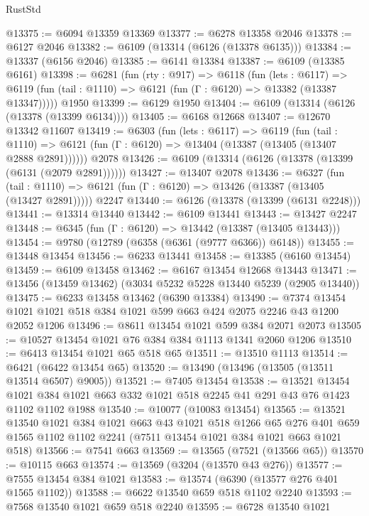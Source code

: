\begin{lexlean}{RustStd}
\begin{coremodule}
@13375 := @6094 @13359 @13369
@13377 := @6278 @13358 @2046
@13378 := @6127 @2046
@13382 := @6109 (@13314 (@6126 (@13378 @6135)))
@13384 := @13337 (@6156 @2046)
@13385 := @6141 @13384
@13387 := @6109 (@13385 @6161)
@13398 := @6281
    (fun (rty : @917) =>
    @6118
      (fun (lets : @6117) =>
      @6119 (fun (tail : @1110) => @6121 (fun (Γ : @6120) => @13382 (@13387 @13347)))))
    @1950
@13399 := @6129 @1950
@13404 := @6109 (@13314 (@6126 (@13378 (@13399 @6134))))
@13405 := @6168 @12668
@13407 := @12670 @13342 @11607
@13419 := @6303
    (fun (lets : @6117) =>
    @6119
      (fun (tail : @1110) =>
      @6121 (fun (Γ : @6120) => @13404 (@13387 (@13405 (@13407 @2888 @2891))))))
    @2078
@13426 := @6109 (@13314 (@6126 (@13378 (@13399 (@6131 (@2079 @2891))))))
@13427 := @13407 @2078
@13436 := @6327
    (fun (tail : @1110) => @6121 (fun (Γ : @6120) => @13426 (@13387 (@13405 (@13427 @2891)))))
    @2247
@13440 := @6126 (@13378 (@13399 (@6131 @2248)))
@13441 := @13314 @13440
@13442 := @6109 @13441
@13443 := @13427 @2247
@13448 := @6345 (fun (Γ : @6120) => @13442 (@13387 (@13405 @13443)))
@13454 := @9780 (@12789 (@6358 (@6361 (@9777 @6366)) @6148))
@13455 := @13448 @13454
@13456 := @6233 @13441
@13458 := @13385 (@6160 @13454)
@13459 := @6109 @13458
@13462 := @6167 @13454 @12668 @13443
@13471 := @13456 (@13459 @13462) (@3034 @5232 @5228 @13440 @5239 (@2905 @13440))
@13475 := @6233 @13458 @13462 (@6390 @13384)
@13490 := @7374 @13454 @1021 @1021 @518 @384 @1021 @599 @663 @424 @2075 @2246 @43 @1200 @2052 @1206
@13496 := @8611 @13454 @1021 @599 @384 @2071 @2073
@13505 := @10527 @13454 @1021 @76 @384 @384 @1113 @1341 @2060 @1206
@13510 := @6413 @13454 @1021 @65 @518 @65
@13511 := @13510 @1113
@13514 := @6421 (@6422 @13454 @65)
@13520 := @13490 (@13496 (@13505 (@13511 @13514 @6507) @9005))
@13521 := @7405 @13454
@13538 := @13521
    @13454
    @1021
    @384
    @1021
    @663
    @332
    @1021
    @518
    @2245
    @41
    @291
    @43
    @76
    @1423
    @1102
    @1102
    @1988
@13540 := @10077 (@10083 @13454)
@13565 := @13521
    @13540
    @1021
    @384
    @1021
    @663
    @43
    @1021
    @518
    @1266
    @65
    @276
    @401
    @659
    @1565
    @1102
    @1102
    @2241
    (@7511 @13454 @1021 @384 @1021 @663 @1021 @518)
@13566 := @7541 @663
@13569 := @13565 (@7521 (@13566 @65))
@13570 := @10115 @663
@13574 := @13569 (@3204 (@13570 @43 @276))
@13577 := @7555 @13454 @384 @1021
@13583 := @13574 (@6390 (@13577 @276 @401 @1565 @1102))
@13588 := @6622 @13540 @659 @518 @1102 @2240
@13593 := @7568 @13540 @1021 @659 @518 @2240
@13595 := @6728 @13540 @1021

\end{coremodule}
\end{lexlean}
